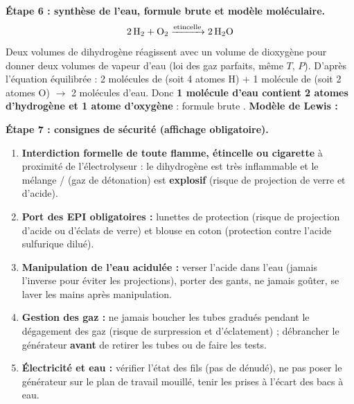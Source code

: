 \documentclass[11pt]{article}
\begin{document}
\begin{exoresolu}
\textbf{Étape 6 : synthèse de l'eau, formule brute et modèle moléculaire.}
\[ \ce{2H2 + O2 ->[etincelle] 2H2O} \]
Deux volumes de dihydrogène réagissent avec un volume de dioxygène pour donner deux volumes de vapeur d'eau (loi des gaz parfaits, même $T$, $P$).
D'après l'équation équilibrée : 2 molécules de  (soit 4 atomes H) + 1 molécule de  (soit 2 atomes O) $\rightarrow$ 2 molécules d'eau.
Donc \textbf{1 molécule d'eau contient 2 atomes d'hydrogène et 1 atome d'oxygène} : formule brute .
\textbf{Modèle de Lewis :}
\begin{center}
\end{center}

\textbf{Étape 7 : consignes de sécurité (affichage obligatoire).}
\begin{enumerate}
\item \textbf{Interdiction formelle de toute flamme, étincelle ou cigarette} à proximité de l'électrolyseur : le dihydrogène est très inflammable et le mélange / (gaz de détonation) est \textbf{explosif} (risque de projection de verre et d'acide).
\item \textbf{Port des EPI obligatoires :} lunettes de protection (risque de projection d'acide ou d'éclats de verre) et blouse en coton (protection contre l'acide sulfurique dilué).
\item \textbf{Manipulation de l'eau acidulée :} verser l'acide dans l'eau (jamais l'inverse pour éviter les projections), porter des gants, ne jamais goûter, se laver les mains après manipulation.
\item \textbf{Gestion des gaz :} ne jamais boucher les tubes gradués pendant le dégagement des gaz (risque de surpression et d'éclatement) ; débrancher le générateur \textbf{avant} de retirer les tubes ou de faire les tests.
\item \textbf{Électricité et eau :} vérifier l'état des fils (pas de dénudé), ne pas poser le générateur sur le plan de travail mouillé, tenir les prises à l'écart des bacs à eau.
\end{enumerate}
\end{exoresolu}
\end{document}
